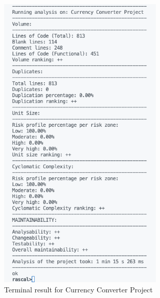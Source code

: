 \documentclass[11pt]{report}
\begin{document}
\begin{appendices}
\begin{figure}[h!]
    \centering
    \includegraphics[width=0.7\textwidth]{images/currency_converter.png}
    \caption{Terminal result for Currency Converter Project}
    \label{fig:currency-converter}
\end{figure}

\end{appendices}
\end{document}
